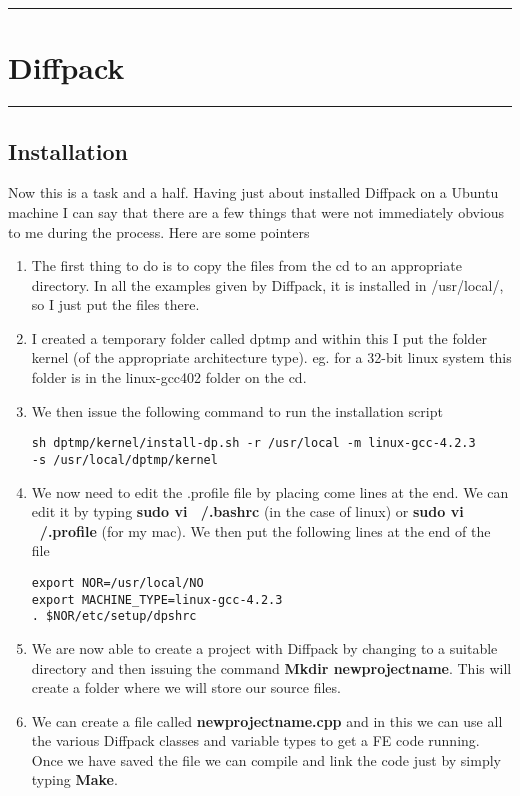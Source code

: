 \documentclass[a4paper, 10pt]{article}
\newcommand{\mytoprule}{\hrule\vspace{4mm}}
\newcommand{\mybotrule}{\vspace{4mm}\hrule}
\begin{document}
\mybotrule

\vspace{10mm}
\section*{Diffpack}

\mytoprule
\subsection*{Installation}
Now this is a task and a half. Having just about installed Diffpack on a Ubuntu machine I can say that there are a few things that were not immediately obvious to me during the process. Here are some pointers
\begin{enumerate}
\item The first thing to do is to copy the files from the cd to an appropriate directory. In all the examples given by Diffpack, it is installed in /usr/local/, so I just put the files there.
\item I created a temporary folder called dptmp and within this I put the folder kernel (of the appropriate architecture type). eg. for a 32-bit linux system this folder is in the linux-gcc402 folder on the cd.
\item We then issue the following command to run the installation script 
\begin{verbatim}
sh dptmp/kernel/install-dp.sh -r /usr/local -m linux-gcc-4.2.3 
-s /usr/local/dptmp/kernel
\end{verbatim}
\item We now need to edit the .profile file by placing come lines at the end. We can edit it by typing {\bf sudo vi ~/.bashrc} (in the case of linux) or {\bf sudo vi ~/.profile} (for my mac). We then put the following lines at the end of the file
\begin{verbatim}
export NOR=/usr/local/NO
export MACHINE_TYPE=linux-gcc-4.2.3
. $NOR/etc/setup/dpshrc
\end{verbatim} 
\item We are now able to create a project with Diffpack by changing to a suitable directory and then issuing the command {\bf Mkdir newprojectname}. This will create a folder where we will store our source files. 
\item We can create a file called {\bf newprojectname.cpp} and in this we can use all the various Diffpack classes and variable types to get a FE code running. Once we have saved the file we can compile and link the code just by simply typing {\bf Make}.

\end{enumerate}
\end{document}
